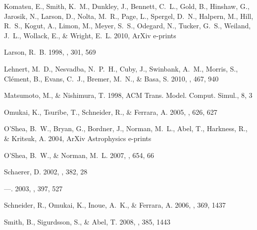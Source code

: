 \documentclass[apjl]{emulateapj}
\begin{document}
\begin{thebibliography}{50}
{Komatsu}, E., {Smith}, K.~M., {Dunkley}, J., {Bennett}, C.~L., {Gold}, B.,
  {Hinshaw}, G., {Jarosik}, N., {Larson}, D., {Nolta}, M.~R., {Page}, L.,
  {Spergel}, D.~N., {Halpern}, M., {Hill}, R.~S., {Kogut}, A., {Limon}, M.,
  {Meyer}, S.~S., {Odegard}, N., {Tucker}, G.~S., {Weiland}, J.~L., {Wollack},
  E., \& {Wright}, E.~L. 2010, ArXiv e-prints

{Larson}, R.~B. 1998, \mnras, 301, 569

{Lehnert}, M.~D., {Nesvadba}, N.~P.~H., {Cuby}, J., {Swinbank}, A.~M.,
  {Morris}, S., {Cl{\'e}ment}, B., {Evans}, C.~J., {Bremer}, M.~N., \& {Basa},
  S. 2010, \nat, 467, 940

Matsumoto, M., \& Nishimura, T. 1998, ACM Trans. Model. Comput. Simul., 8, 3

{Omukai}, K., {Tsuribe}, T., {Schneider}, R., \& {Ferrara}, A. 2005, \apj, 626,
  627

{O'Shea}, B.~W., {Bryan}, G., {Bordner}, J., {Norman}, M.~L., {Abel}, T.,
  {Harkness}, R., \& {Kritsuk}, A. 2004, ArXiv Astrophysics e-prints

{O'Shea}, B.~W., \& {Norman}, M.~L. 2007, \apj, 654, 66

{Schaerer}, D. 2002, \aap, 382, 28

---. 2003, \aap, 397, 527

{Schneider}, R., {Omukai}, K., {Inoue}, A.~K., \& {Ferrara}, A. 2006, \mnras,
  369, 1437

{Smith}, B., {Sigurdsson}, S., \& {Abel}, T. 2008, \mnras, 385, 1443


\end{thebibliography}
\end{document}
